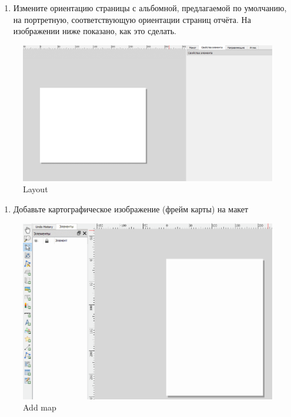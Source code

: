 \documentclass[
  12pt,
]{book}
\providecommand{\tightlist}{%
  \setlength{\itemsep}{0pt}\setlength{\parskip}{0pt}}
\begin{document}
\begin{enumerate}
\def\labelenumi{\arabic{enumi}.}
\setcounter{enumi}{2}
\tightlist
\item
  Измените ориентацию страницы с альбомной, предлагаемой по умолчанию, на портретную, соответствующую ориентации страниц отчёта. На изображении ниже показано, как это сделать.
\end{enumerate}

\begin{figure}
\centering
\includegraphics{images/Ex05_Vectorization/album_portrait.gif}
\caption{Layout}
\end{figure}

\begin{enumerate}
\def\labelenumi{\arabic{enumi}.}
\setcounter{enumi}{3}
\tightlist
\item
  Добавьте картографическое изображение (фрейм карты) на макет
\end{enumerate}

\begin{figure}
\centering
\includegraphics{images/Ex05_Vectorization/add_map.gif}
\caption{Add map}
\end{figure}
\end{document}
